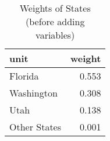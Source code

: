 \begin{table}[!h]

\caption{Weights of States (before adding variables)}
\centering
\begin{tabular}[t]{l|r}
\hline
unit & weight\\
\hline
Florida & 0.553\\
\hline
Washington & 0.308\\
\hline
Utah & 0.138\\
\hline
Other States & 0.001\\
\hline
\end{tabular}
\end{table}
    